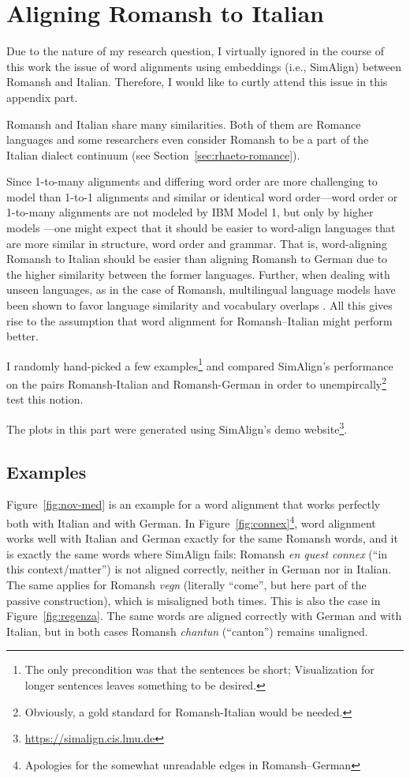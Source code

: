 \chapter{Aligning Romansh to Italian}\label{app:rm-it}

Due to the nature of my research question, I virtually ignored in the course of this work the issue of word alignments using embeddings (i.e., SimAlign) between Romansh and Italian. 
Therefore, I would like to curtly attend this issue in this appendix part.

Romansh and Italian share many similarities. 
Both of them are Romance languages and some researchers even consider Romansh to be a part of the Italian dialect continuum (see Section~\ref{sec:rhaeto-romance}). 

Since 1-to-many alignments and differing word order are more challenging to model than 1-to-1 alignments and similar or identical word order---word order or 1-to-many alignments are not modeled by IBM Model 1, but only by higher models \autocite{brown-etal-1993-mathematics}---one might expect that it should be easier to word-align languages that are more similar in structure, word order and grammar. 
That is, word-aligning Romansh to Italian should be easier than aligning Romansh to German due to the higher similarity between the former languages.
Further, when dealing with unseen languages, as in the case of Romansh, multilingual language models have been shown to favor language similarity and vocabulary overlaps \autocite{pires-etal-2019-multilingual}. 
All this gives rise to the assumption that word alignment for Romansh--Italian might perform better.

I randomly hand-picked a few examples\footnote{The only precondition was that the sentences be short; Visualization for longer sentences leaves something to be desired.} and compared SimAlign's performance on the pairs Romansh-Italian and Romansh-German in order to unempircally\footnote{Obviously, a gold standard for Romansh-Italian would be needed.} test this notion.

The plots in this part were generated using SimAlign's demo website\footnote{\url{https://simalign.cis.lmu.de}}.

\section{Examples}
Figure~\ref{fig:nov-med} is an example for a word alignment that works perfectly both with Italian and with German. 
In Figure~\ref{fig:connex}\footnote{Apologies for the somewhat unreadable edges in Romansh--German}, word alignment works well with Italian and German exactly for the same Romansh words, and it is exactly the same words where SimAlign fails: 
Romansh \emph{en quest connex} (\enquote{in this context/matter}) is not aligned correctly, neither in German nor in Italian. 
The same applies for Romansh \emph{vegn} (literally \enquote{come}, but here part of the passive construction), which is misaligned both times.
This is also the case in Figure~\ref{fig:regenza}. 
The same words are aligned correctly with German and with Italian, 
but in both cases Romansh \emph{chantun} (\enquote{canton}) remains unaligned.


